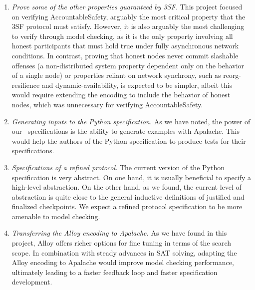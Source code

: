 
\begin{enumerate}

  \item \emph{Prove some of the other properties guaranteed by 3SF.} This project focused on verifying AccountableSafety, arguably the most critical property that the 3SF protocol must satisfy.
  However, it is also arguably the most challenging to verify through model checking, as it is the only property involving all honest participants that must hold true under fully asynchronous network conditions.
  In contrast, proving that honest nodes never commit slashable offenses (a non-distributed system property dependent only on the behavior of a single node) or properties reliant on network synchrony, such as reorg-resilience and dynamic-availability, is expected to be simpler, albeit this would require extending the \tlap{} encoding to include the behavior of honest nodes, which was unnecessary for verifying AccountableSafety.


  \item \emph{Generating inputs to the Python specification.} As we have noted,
    the power of our~\tlap{} specifications is the ability to generate examples
    with Apalache. This would help the authors of the Python specification to
    produce tests for their specifications.

  \item \emph{Specifications of a refined protocol.} The current version of the
    Python specification is very abstract. On one hand, it is usually
    beneficial to specify a high-level abstraction. On the other hand, as we
    found, the current level of abstraction is quite close to the general
    inductive definitions of justified and finalized checkpoints. We expect a
    refined protocol specification to be more amenable to model checking.

  \item \emph{Transferring the Alloy encoding to Apalache.} As we have found in
    this project, Alloy offers richer options for fine tuning in terms of the
    search scope. In combination with steady advances in SAT solving, adapting
    the Alloy encoding to Apalache would improve model checking performance,
    ultimately leading to a faster feedback loop and faster specification
    development.

\end{enumerate}

